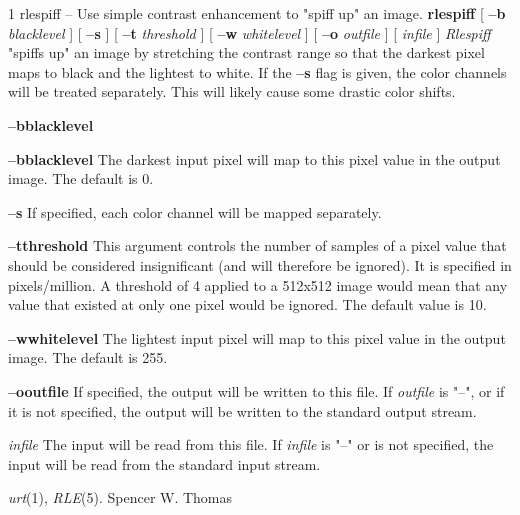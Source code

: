 %
%
%
 1
rlespiff -- Use simple contrast enhancement to "spiff up" an image.
{\bf rlespiff}
[
{\bf --b}
{\it blacklevel}
] [
{\bf --s}
] [
{\bf --t}
{\it threshold}
] [
{\bf --w} 
{\it whitelevel}
] [
{\bf --o} 
{\it outfile} 
] [
{\it infile}
]
{\it Rlespiff}
"spiffs up" an
image by stretching the contrast range so that the darkest pixel maps
to black and the lightest to white.  If the
{\bf --s}
flag is given, the color channels will be treated separately.  This
will likely cause some drastic color shifts.
\begin{TPlist}{{\bf --b}{\it }{\bf blacklevel}
}
\item[{{\bf --b}{\it }{\bf blacklevel}
}]
The darkest input pixel will map to this pixel value in the
output image.  The default is 0.
\item[{{\bf --s}}]
If specified, each color channel will be mapped separately.
\item[{{\bf --t}{\it }{\bf threshold}
}]
This argument controls the number of samples of a pixel value that
should be considered insignificant (and will therefore be ignored).
It is specified in pixels/million.  A threshold of 4 applied to a
512x512 image would mean that any value that existed at only one pixel
would be ignored.  The default value is 10.
\item[{{\bf --w}{\it }{\bf whitelevel}
}]
The lightest input pixel will map to this pixel value in the output
image.  The default is 255.
\item[{{\bf --o}{\it }{\bf outfile}
}]
If specified, the output will be written to this file.  If 
{\it outfile}
is "--", or if it is not specified, the output will be written to the
standard output stream.
\item[{{\it infile}}]
The input will be read from this file.  If
{\it infile}
is "--" or is not specified, the input will be read from the standard
input stream.
\end{TPlist}
{\it urt}{\rm (1),}
{\it RLE}{\rm (5).}
Spencer W. Thomas
\newpage


